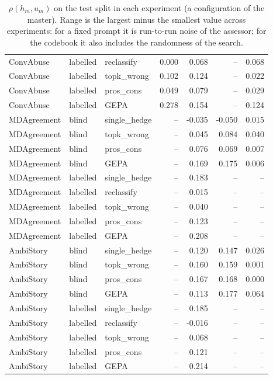 \begin{table}[t]
\begin{tabular}{lllrrrr}
ConvAbuse & labelled & reclassify & 0.000 & 0.068 & -- & 0.068 \\
ConvAbuse & labelled & topk\_wrong & 0.102 & 0.124 & -- & 0.022 \\
ConvAbuse & labelled & pros\_cons & 0.049 & 0.079 & -- & 0.029 \\
ConvAbuse & labelled & GEPA & 0.278 & 0.154 & -- & 0.124 \\
MDAgreement & blind & single\_hedge & -- & -0.035 & -0.050 & 0.015 \\
MDAgreement & blind & topk\_wrong & -- & 0.045 & 0.084 & 0.040 \\
MDAgreement & blind & pros\_cons & -- & 0.076 & 0.069 & 0.007 \\
MDAgreement & blind & GEPA & -- & 0.169 & 0.175 & 0.006 \\
MDAgreement & labelled & single\_hedge & -- & 0.183 & -- & -- \\
MDAgreement & labelled & reclassify & -- & 0.015 & -- & -- \\
MDAgreement & labelled & topk\_wrong & -- & 0.040 & -- & -- \\
MDAgreement & labelled & pros\_cons & -- & 0.123 & -- & -- \\
MDAgreement & labelled & GEPA & -- & 0.208 & -- & -- \\
AmbiStory & blind & single\_hedge & -- & 0.120 & 0.147 & 0.026 \\
AmbiStory & blind & topk\_wrong & -- & 0.160 & 0.159 & 0.001 \\
AmbiStory & blind & pros\_cons & -- & 0.167 & 0.168 & 0.000 \\
AmbiStory & blind & GEPA & -- & 0.113 & 0.177 & 0.064 \\
AmbiStory & labelled & single\_hedge & -- & 0.185 & -- & -- \\
AmbiStory & labelled & reclassify & -- & -0.016 & -- & -- \\
AmbiStory & labelled & topk\_wrong & -- & 0.068 & -- & -- \\
AmbiStory & labelled & pros\_cons & -- & 0.121 & -- & -- \\
AmbiStory & labelled & GEPA & -- & 0.214 & -- & -- \\
\hline
\end{tabular}
\caption{$\rho(h_m,u_m)$ on the test split in each experiment (a configuration of the master). Range is the largest minus the smallest value across experiments: for a fixed prompt it is run-to-run noise of the assessor; for the codebook it also includes the randomness of the search.}
\label{tab:experiments}
\end{table}